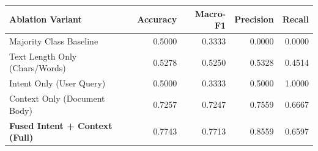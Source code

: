 \begin{tabular}{lrrrr}
\toprule
\textbf{Ablation Variant} & \textbf{Accuracy} & \textbf{Macro-F1} & \textbf{Precision} & \textbf{Recall} \\
\midrule
Majority Class Baseline & 0.5000 & 0.3333 & 0.0000 & 0.0000 \\
Text Length Only (Chars/Words) & 0.5278 & 0.5250 & 0.5328 & 0.4514 \\
Intent Only (User Query) & 0.5000 & 0.3333 & 0.5000 & 1.0000 \\
Context Only (Document Body) & 0.7257 & 0.7247 & 0.7559 & 0.6667 \\
\midrule
\textbf{Fused Intent + Context (Full)} & 0.7743 & 0.7713 & 0.8559 & 0.6597 \\
\bottomrule
\end{tabular}
